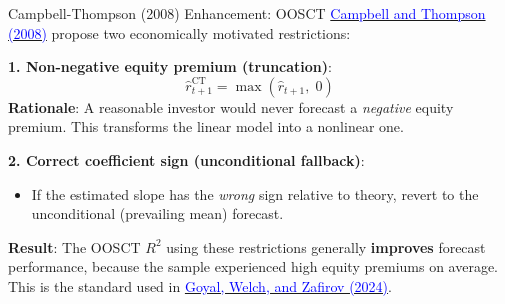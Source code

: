 \documentclass{beamer}
\begin{document}
\begin{frame}{Campbell-Thompson (2008) Enhancement: OOSCT}
    \href{https://doi.org/10.1093/rfs/hhm055}{\textcolor{blue}{Campbell and Thompson (2008)}} propose two economically motivated restrictions:

    \vspace{0.3cm}
    \textbf{1. Non-negative equity premium (truncation)}:
    \begin{equation}
        \hat{r}_{t+1}^{\text{CT}} = \max\left(\hat{r}_{t+1},\; 0\right)
    \end{equation}
    \textbf{Rationale}: A reasonable investor would never forecast a \textit{negative} equity premium. This transforms the linear model into a nonlinear one.

    \vspace{0.3cm}
    \textbf{2. Correct coefficient sign (unconditional fallback)}:
    \begin{itemize}
        \item If the estimated slope has the \textit{wrong} sign relative to theory, revert to the unconditional (prevailing mean) forecast.
    \end{itemize}

    \vspace{0.3cm}
    \textbf{Result}: The OOSCT $R^2$ using these restrictions generally \textbf{improves} forecast performance, because the sample experienced high equity premiums on average. This is the standard used in \href{https://doi.org/10.1093/rfs/hhae044}{\textcolor{blue}{Goyal, Welch, and Zafirov (2024)}}.
\end{frame}
\end{document}
